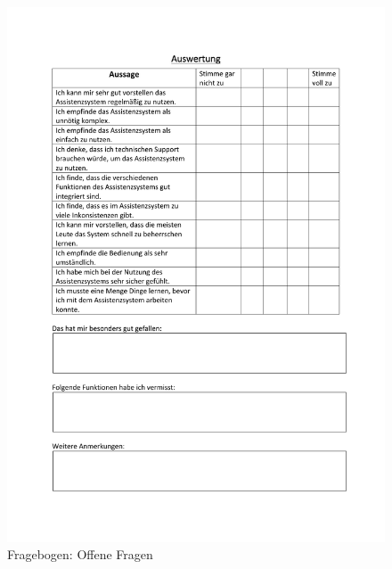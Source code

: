 \begin{figure}[t!]
\centering
\includegraphics[scale=0.71]{DA_files/Bilder/Anhang/Fragebogen-Auswertung-2.pdf}
\caption{Fragebogen: Offene Fragen}
\end{figure}